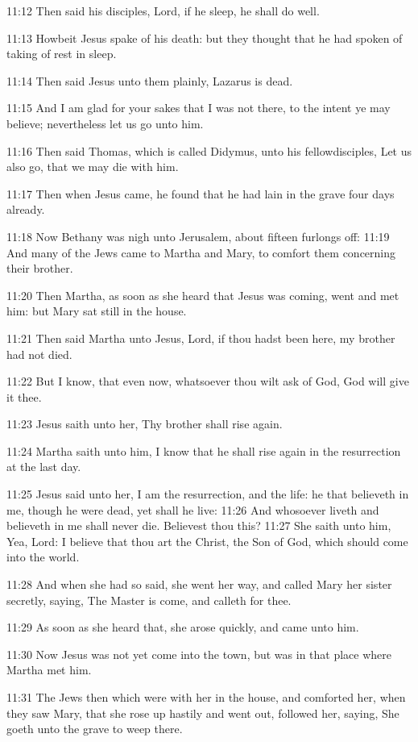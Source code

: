 11:12 Then said his disciples, Lord, if he sleep, he shall do well.

11:13 Howbeit Jesus spake of his death: but they thought that he had spoken of taking of rest in sleep.

11:14 Then said Jesus unto them plainly, Lazarus is dead.

11:15 And I am glad for your sakes that I was not there, to the intent ye may believe; nevertheless let us go unto him.

11:16 Then said Thomas, which is called Didymus, unto his fellowdisciples, Let us also go, that we may die with him.

11:17 Then when Jesus came, he found that he had lain in the grave four days already.

11:18 Now Bethany was nigh unto Jerusalem, about fifteen furlongs off: 11:19 And many of the Jews came to Martha and Mary, to comfort them concerning their brother.

11:20 Then Martha, as soon as she heard that Jesus was coming, went and met him: but Mary sat still in the house.

11:21 Then said Martha unto Jesus, Lord, if thou hadst been here, my brother had not died.

11:22 But I know, that even now, whatsoever thou wilt ask of God, God will give it thee.

11:23 Jesus saith unto her, Thy brother shall rise again.

11:24 Martha saith unto him, I know that he shall rise again in the resurrection at the last day.

11:25 Jesus said unto her, I am the resurrection, and the life: he that believeth in me, though he were dead, yet shall he live: 11:26 And whosoever liveth and believeth in me shall never die. Believest thou this?  11:27 She saith unto him, Yea, Lord: I believe that thou art the Christ, the Son of God, which should come into the world.

11:28 And when she had so said, she went her way, and called Mary her sister secretly, saying, The Master is come, and calleth for thee.

11:29 As soon as she heard that, she arose quickly, and came unto him.

11:30 Now Jesus was not yet come into the town, but was in that place where Martha met him.

11:31 The Jews then which were with her in the house, and comforted her, when they saw Mary, that she rose up hastily and went out, followed her, saying, She goeth unto the grave to weep there.

